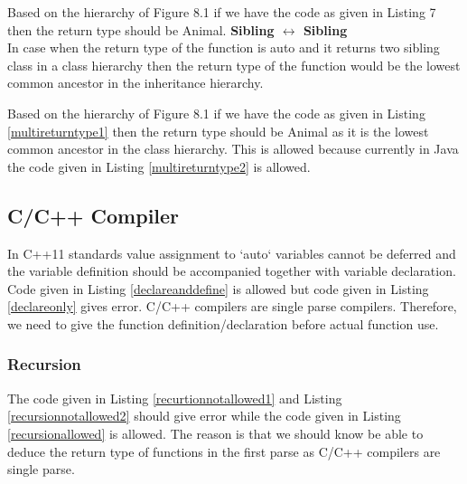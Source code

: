 Based on the hierarchy of Figure 8.1 if we have the code as given in Listing 7 then the return type should be Animal.
\textbf{Sibling $\leftrightarrow$ Sibling}\\
In case when the return type of the function is auto and it returns two sibling class in a class hierarchy then the return type of the function would be the lowest common ancestor in the inheritance hierarchy. 

Based on the hierarchy of Figure 8.1 if we have the code as given in Listing \ref{multireturntype1} then the return type should be Animal as it is the lowest common ancestor in the class hierarchy. 
This is allowed because currently in Java the code given in Listing \ref{multireturntype2} is allowed. 

\subsection{C/C++ Compiler}
In C++11 standards value assignment to `auto` variables cannot be deferred and the variable definition should be accompanied together with variable declaration.
Code given in Listing \ref{declareanddefine} is allowed but code given in Listing \ref{declareonly} gives error. 
C/C++ compilers are single parse compilers. Therefore, we need to give the function definition/declaration before actual function use. 
\subsubsection{Recursion}
The code given in Listing \ref{recurtionnotallowed1} and Listing \ref{recursionnotallowed2} should give error while the code given in Listing \ref{recursionallowed} is allowed. The reason is that we should know be able to deduce the  return type of functions in the first parse as C/C++ compilers are single parse.


